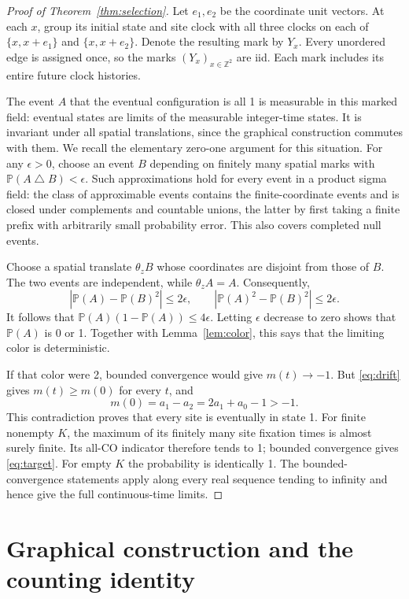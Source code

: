 \documentclass[11pt,a4paper]{article}
\newcommand{\Prob}{\mathbb P}
\newcommand{\Z}{\mathbb Z}
\begin{document}
\begin{proof}[Proof of Theorem~\ref{thm:selection}]
Let \(e_1,e_2\) be the coordinate unit vectors. At each \(x\), group its
initial state and site clock with all three clocks on each of
\(\{x,x+e_1\}\) and \(\{x,x+e_2\}\). Denote the resulting mark by \(Y_x\).
Every unordered edge is assigned once, so the marks
\((Y_x)_{x\in\Z^2}\) are iid. Each mark includes its entire future clock
histories.

The event \(A\) that the eventual configuration is all 1 is measurable
in this marked field: eventual states are limits of the measurable
integer-time states. It is invariant under all spatial translations,
since the graphical construction commutes with them.
We recall the elementary zero-one argument for this situation.
For any \(\epsilon>0\), choose an event \(B\) depending on finitely many
spatial marks with \(\Prob(A\mathbin{\triangle} B)<\epsilon\).
Such approximations hold for every event in a product sigma field:
the class of approximable events contains the finite-coordinate events
and is closed under complements and countable unions, the latter by
first taking a finite prefix with arbitrarily small probability error.
This also covers completed null events.

Choose a spatial translate \(\theta_zB\) whose coordinates are disjoint
from those of \(B\). The two events are independent, while
\(\theta_zA=A\). Consequently,
\[
 |\Prob(A)-\Prob(B)^2|\le2\epsilon,\qquad
 |\Prob(A)^2-\Prob(B)^2|\le2\epsilon.
\]
It follows that \(\Prob(A)(1-\Prob(A))\le4\epsilon\).
Letting \(\epsilon\) decrease to zero shows that \(\Prob(A)\) is 0 or 1.
Together with Lemma~\ref{lem:color}, this says that the limiting color
is deterministic.

If that color were 2, bounded convergence would give \(m(t)\to-1\).
But \eqref{eq:drift} gives \(m(t)\ge m(0)\) for every \(t\), and
\[
 m(0)=a_1-a_2=2a_1+a_0-1>-1.
\]
This contradiction proves that every site is eventually in state 1.
For finite nonempty \(K\), the maximum of its finitely many site
fixation times is almost surely finite. Its all-CO indicator therefore
tends to 1; bounded convergence gives \eqref{eq:target}. For empty \(K\)
the probability is identically 1. The bounded-convergence statements
apply along every real sequence tending to infinity and hence give
the full continuous-time limits.
\end{proof}

\appendix
\section{Graphical construction and the counting identity}\label{sec:clocks}
\end{document}
